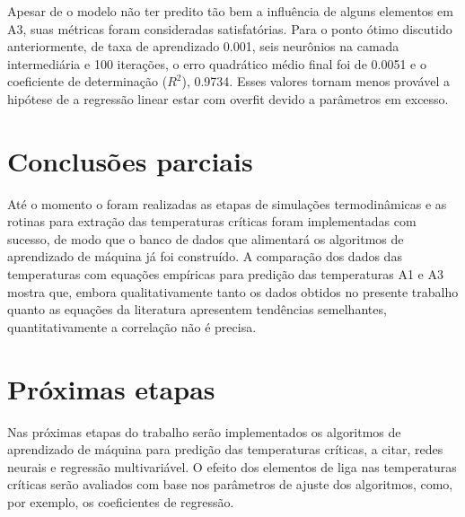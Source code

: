 \documentclass[brazil,tf,epusp]{usp}  %
\begin{document}
Apesar de o modelo não ter predito tão bem a influência de alguns elementos em A3, suas métricas foram consideradas satisfatórias. Para o ponto ótimo discutido anteriormente, de taxa de aprendizado 0.001, seis neurônios na camada intermediária e 100 iterações, o erro quadrático médio final foi de 0.0051 e o coeficiente de determinação ($R^{2}$), 0.9734. Esses valores tornam menos provável a hipótese de a regressão linear estar com overfit devido a parâmetros em excesso.

\chapter{Conclusões parciais}

Até o momento o foram realizadas as etapas de simulações termodinâmicas e as rotinas para extração das temperaturas críticas foram implementadas com sucesso, de modo que o banco de dados que alimentará os algoritmos de aprendizado de máquina já foi construído. A comparação dos dados das temperaturas com equações empíricas para predição das temperaturas A1 e A3 mostra que, embora qualitativamente tanto os dados obtidos no presente trabalho quanto as equações da literatura apresentem tendências semelhantes, quantitativamente a correlação não é precisa.

\chapter{Próximas etapas}

Nas próximas etapas do trabalho serão implementados os algoritmos de aprendizado de máquina para predição das temperaturas críticas, a citar, redes neurais e regressão multivariável. O efeito dos elementos de liga nas temperaturas críticas serão avaliados com base nos parâmetros de ajuste dos algoritmos, como, por exemplo, os coeficientes de regressão.




\label{an:diag_bin}
\end{document}

